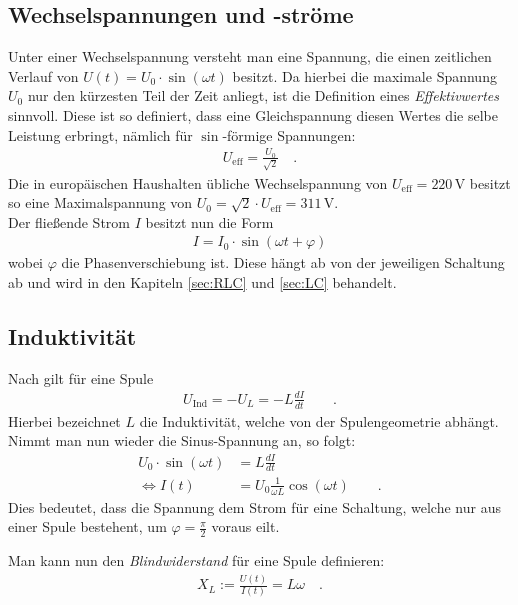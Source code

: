 \documentclass[12pt,a4paper,titlepage,headinclude,bibtotoc]{scrartcl}
\begin{document}
\subsection{Wechselspannungen und -ströme}
Unter einer Wechselspannung versteht man eine Spannung, die einen zeitlichen Verlauf von $U(t)= U_0\cdot\sin(\omega t)$ besitzt.
Da hierbei die maximale Spannung $U_0$ nur den kürzesten Teil der Zeit anliegt, ist die Definition eines \emph{Effektivwertes} sinnvoll.
Diese ist so definiert, dass eine Gleichspannung diesen Wertes die selbe Leistung erbringt, nämlich für $\sin$-förmige Spannungen:
\begin{align*}
U_\text{eff}=\frac{U_0}{\sqrt2}\quad .
\end{align*}
Die in europäischen Haushalten übliche Wechselspannung von $U_\text{eff}=220\,\si\volt$ besitzt so eine Maximalspannung von $U_0=\sqrt2\cdot U_\text{eff}=311\,\si\volt$.\\

Der fließende Strom $I$ besitzt nun die Form
\begin{align*}
I=I_0\cdot\sin(\omega t+\varphi)
\end{align*}
wobei $\varphi$ die Phasenverschiebung ist.
Diese hängt ab von der jeweiligen Schaltung ab und wird in den Kapiteln \ref{sec:RLC} und \ref{sec:LC} behandelt.

\subsection{Induktivität}
Nach \cite[S. 313]{griffith} gilt für eine Spule
\begin{align}
U_\text{Ind}=-U_L=-L\frac{dI}{dt}\qquad .
\end{align}
Hierbei bezeichnet $L$ die Induktivität, welche von der Spulengeometrie abhängt.
Nimmt man nun wieder die Sinus-Spannung an, so folgt:
\begin{align*}
U_0\cdot\sin(\omega t)&=L\frac{dI}{dt}\\
\Leftrightarrow I(t)&=U_0\frac{1}{\omega L}\cos(\omega t)\qquad .
\end{align*}
Dies bedeutet, dass die Spannung dem Strom für eine Schaltung, welche nur aus einer Spule bestehent, um $\varphi=\frac{\pi}{2}$ voraus eilt.

Man kann nun den \emph{Blindwiderstand} für eine Spule definieren:
\begin{align}
X_L:=\frac{U(t)}{I(t)}=L\omega\quad .
\end{align}
\end{document}
